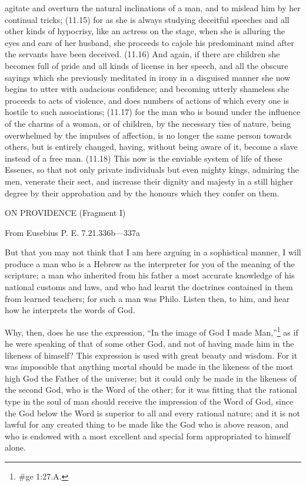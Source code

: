 agitate and overturn the natural inclinations of a man, and to mislead him by her continual tricks;
(11.15) for as she is always studying deceitful speeches and all other kinds of hypocrisy, like an actress
on the stage, when she is alluring the eyes and ears of her husband, she proceeds to cajole his
predominant mind after the servants have been deceived. (11.16) And again, if there are children she
becomes full of pride and all kinds of license in her speech, and all the obscure sayings which she
previously meditated in irony in a disguised manner she now begins to utter with audacious confidence;
and becoming utterly shameless she proceeds to acts of violence, and does numbers of actions of which
every one is hostile to such associations; (11.17) for the man who is bound under the influence of the
charms of a woman, or of children, by the necessary ties of nature, being overwhelmed by the impulses
of affection, is no longer the same person towards others, but is entirely changed, having, without being
aware of it, become a slave instead of a free man. (11.18) This now is the enviable system of life of these
Essenes, so that not only private individuals but even mighty kings, admiring the men, venerate their
sect, and increase their dignity and majesty in a still higher degree by their approbation and by the
honours which they confer on them.


ON PROVIDENCE (Fragment I)

From Eusebius P. E. 7.21.336b—337a

But that you may not think that I am here arguing in a sophistical manner, I will produce a man who is
a Hebrew as the interpreter for you of the meaning of the scripture; a man who inherited from his father
a most accurate knowledge of his national customs and laws, and who had learnt the doctrines
contained in them from learned teachers; for such a man was Philo. Listen then, to him, and hear how
he interprets the words of God.

Why, then, does he use the expression, ``In the image of God I made Man,''\footnote{\#ge 1:27.A.} as if he
were speaking of that of some other God, and not of having made him in the likeness of himself?
This expression is used with great beauty and wisdom. For it was impossible that anything mortal
should be made in the likeness of the most high God the Father of the universe; but it could only be
made in the likeness of the second God, who is the Word of the other; for it was fitting that the
rational type in the soul of man should receive the impression of the Word of God, since the God
below the Word is superior to all and every rational nature; and it is not lawful for any created thing
to be made like the God who is above reason, and who is endowed with a most excellent and
special form appropriated to himself alone.

